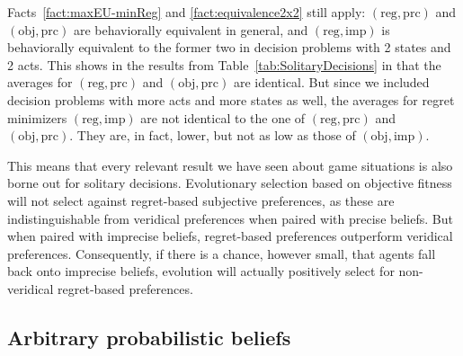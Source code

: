 \documentclass[fleqn,reqno,11pt]{article}
\begin{document}
Facts~\ref{fact:maxEU-minReg} and \ref{fact:equivalence2x2} still apply:
$(\text{reg}, \text{prc})$ and $(\text{obj}, \text{prc})$ are behaviorally equivalent in
general, and $(\text{reg}, \text{imp})$ is behaviorally equivalent to the former two in
decision problems with 2 states and 2 acts. This shows in the results from
Table~\ref{tab:SolitaryDecisions} in that the averages for $(\text{reg}, \text{prc})$ and
$(\text{obj}, \text{prc})$ are identical. But since we included decision problems with more
acts and more states as well, the averages for regret minimizers $(\text{reg}, \text{imp})$ are
not identical to the one of $(\text{reg}, \text{prc})$ and $(\text{obj}, \text{prc})$. They
are, in fact, lower, but not as low as those of $(\text{obj}, \text{imp})$.

This means that every relevant result we have seen about game situations is also borne out for
solitary decisions. Evolutionary selection based on objective fitness will not select against
regret-based subjective preferences, as these are indistinguishable from veridical preferences
when paired with precise beliefs. But when paired with imprecise beliefs, regret-based
preferences outperform veridical preferences. Consequently, if there is a chance, however
small, that agents fall back onto imprecise beliefs, evolution will actually positively select
for non-veridical regret-based preferences.


\iffalse
\subsection{Arbitrary probabilistic beliefs}
\label{sec:arbitr-prob-beli}
\end{document}
